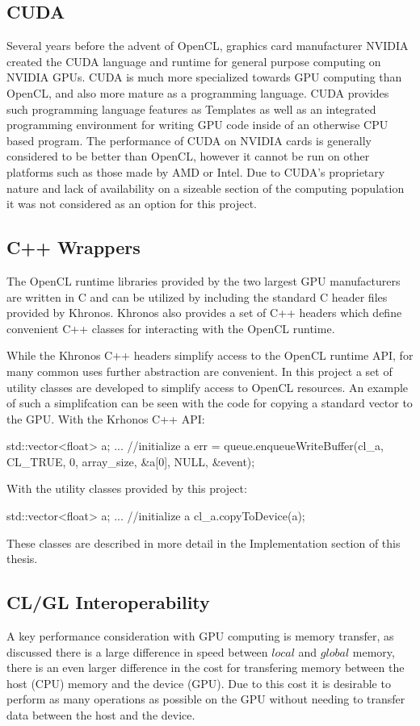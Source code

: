 \subsection{CUDA}
Several years before the advent of OpenCL, graphics card manufacturer NVIDIA created the CUDA
language and runtime for general purpose computing on NVIDIA GPUs. CUDA is much
more specialized towards GPU computing than OpenCL, and also more mature as a
programming language. CUDA provides such programming language features as
Templates as well as an integrated programming environment for writing GPU code
inside of an otherwise CPU based program. The performance of CUDA on NVIDIA
cards is generally considered to be better than OpenCL, however it cannot be
run on other platforms such as those made by AMD or Intel. Due to CUDA's
proprietary nature and lack of availability on a sizeable section of the
computing population it was not considered as an option for this project.


\subsection{C++ Wrappers}
The OpenCL runtime libraries provided by the two largest GPU manufacturers are
written in C and can be utilized by including the standard C header files
provided by Khronos.\cite{OpenCL} Khronos also provides a set of C++ headers
which define convenient C++ classes for interacting with the OpenCL runtime. 


While the Khronos C++ headers simplify access to the OpenCL runtime API, for
many common uses further abstraction are convenient. In this project a set of utility classes are developed to simplify access to OpenCL resources. An example of such a simplifcation can be seen with the code for copying a standard vector to the GPU. With the Krhonos C++ API:
\begin{cppcode}{0}
     std::vector<float> a; 
     ... //initialize a 
     err = queue.enqueueWriteBuffer(cl_a, CL_TRUE, 0, array_size, &a[0], NULL, 
         &event);
\end{cppcode}
With the utility classes provided by this project:
\begin{cppcode}{0}
    std::vector<float> a; 
     ... //initialize a 
    cl_a.copyToDevice(a);
\end{cppcode}

These classes are described in more detail in the Implementation section of this thesis.


\subsection{CL/GL Interoperability}
A key performance consideration with GPU computing is memory transfer, as
discussed there is a large difference in speed between $local$ and $global$
memory, there is an even larger difference in the cost for transfering memory
between the host (CPU) memory and the device (GPU). Due to this cost it is
desirable to perform as many operations as possible on the GPU without needing
to transfer data between the host and the device.


